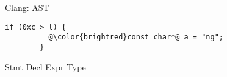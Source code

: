 \begin{frame}[fragile]{Clang: AST}
  \vs{0.2cm}
  \begin{lstlisting}[basicstyle=\LARGE\ttfamily]
        if (0xc > l) {
          @\color{brightred}const char*@ a = "ng";
        }
  \end{lstlisting}

  \vs{0.2cm}
  \begin{center}
    \ttfamily\LARGE
    Stmt\hs{0.2cm}
    Decl\hs{0.2cm}
    Expr\hs{0.2cm}
    \color{brightred}Type
  \end{center}

\end{frame}

